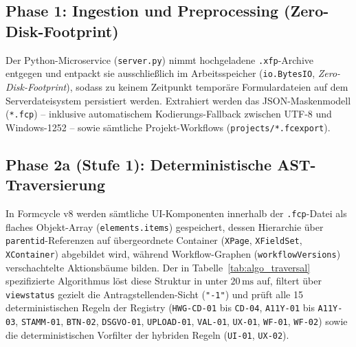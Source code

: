 \subsection{Phase 1: Ingestion und Preprocessing (Zero-Disk-Footprint)}
Der Python-Microservice (\texttt{server.py}) nimmt hochgeladene \texttt{.xfp}-Archive entgegen und entpackt sie ausschließlich im Arbeitsspeicher (\texttt{io.BytesIO}, \textit{Zero-Disk-Footprint}), sodass zu keinem Zeitpunkt temporäre Formulardateien auf dem Serverdateisystem persistiert werden. Extrahiert werden das JSON-Maskenmodell (\texttt{*.fcp}) – inklusive automatischem Kodierungs-Fallback zwischen UTF-8 und Windows-1252 – sowie sämtliche Projekt-Workflows (\texttt{projects/*.fcexport}).

\subsection{Phase 2a (Stufe 1): Deterministische AST-Traversierung}
In Formcycle v8 werden sämtliche UI-Komponenten innerhalb der \texttt{.fcp}-Datei als flaches Objekt-Array (\texttt{elements.items}) gespeichert, dessen Hierarchie über \texttt{parentid}-Referenzen auf übergeordnete Container (\texttt{XPage}, \texttt{XFieldSet}, \texttt{XContainer}) abgebildet wird, während Workflow-Graphen (\texttt{workflowVersions}) verschachtelte Aktionsbäume bilden. Der in Tabelle~\ref{tab:algo_traversal} spezifizierte Algorithmus löst diese Struktur in unter $20\,\text{ms}$ auf, filtert über \texttt{viewstatus} gezielt die Antragstellenden-Sicht (\texttt{"-1"}) und prüft alle 15 deterministischen Regeln der Registry (\texttt{HWG-CD-01} bis \texttt{CD-04}, \texttt{A11Y-01} bis \texttt{A11Y-03}, \texttt{STAMM-01}, \texttt{BTN-02}, \texttt{DSGVO-01}, \texttt{UPLOAD-01}, \texttt{VAL-01}, \texttt{UX-01}, \texttt{WF-01}, \texttt{WF-02}) sowie die deterministischen Vorfilter der hybriden Regeln (\texttt{UI-01}, \texttt{UX-02}).

